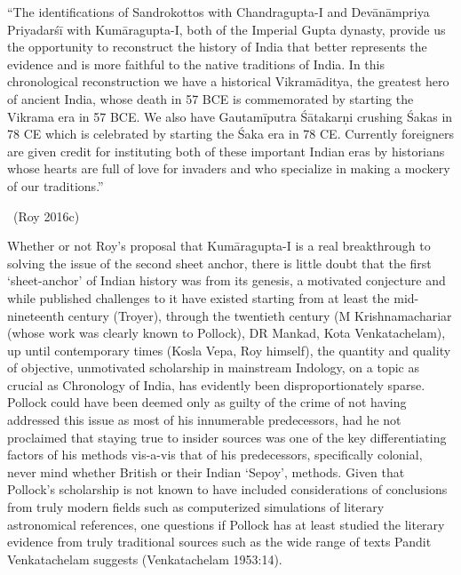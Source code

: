 \begin{myquote}
“The identifications of Sandrokottos with Chandragupta-I and Devānāmpriya Priyadarśī with Kumāragupta-I, both of the Imperial Gupta dynasty, provide us the opportunity to reconstruct the history of India that better represents the evidence and is more faithful to the native traditions of India. In this chronological reconstruction we have a historical Vikramāditya, the greatest hero of ancient India, whose death in 57 BCE is commemorated by starting the Vikrama era in 57 BCE. We also have Gautamīputra Śātakarṇi crushing Śakas in 78 CE which is celebrated by starting the Śaka era in 78 CE. Currently foreigners are given credit for instituting both of these important Indian eras by historians whose hearts are full of love for invaders and who specialize in making a mockery of our traditions.” 

~\hfill (Roy 2016c)
\end{myquote}

Whether or not Roy’s proposal that Kumāragupta-I is a real breakthrough to solving the issue of the second sheet anchor, there is little doubt that the first ‘sheet-anchor’ of Indian history was from its genesis, a motivated conjecture and while published challenges to it have existed starting from at least the mid-nineteenth century (Troyer), through the twentieth century (M Krishnamachariar (whose work was clearly known to Pollock), DR Mankad, Kota Venkatachelam), up until contemporary times (Kosla Vepa, Roy himself), the quantity and quality of objective, unmotivated scholarship in mainstream Indology, on a topic as crucial as Chronology of India, has evidently been disproportionately sparse. Pollock could have been deemed only as guilty of the crime of not having addressed this issue as most of his innumerable predecessors, had he not proclaimed that staying true to insider sources was one of the key differentiating factors of his methods vis-a-vis that of his predecessors, specifically colonial, never mind whether British or their Indian ‘Sepoy’, methods. Given that Pollock’s scholarship is not known to have included considerations of conclusions from truly modern fields such as computerized simulations of literary astronomical references, one questions if Pollock has at least studied the literary evidence from truly traditional sources such as the wide range of texts Pandit Venkatachelam suggests (Venkatachelam 1953:14).



